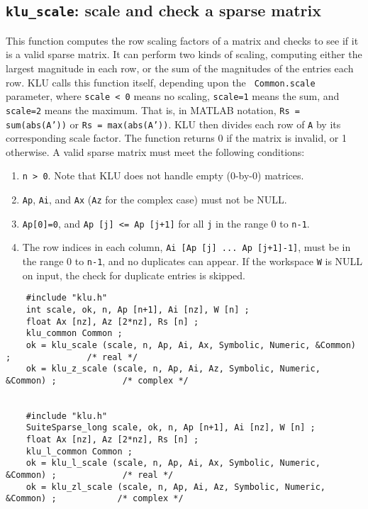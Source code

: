 \documentclass[11pt]{article}
\begin{document}
\subsection{{\tt klu\_scale}: scale and check a sparse matrix}

This function computes the row scaling factors of a matrix and checks to see if
it is a valid sparse matrix.  It can perform two kinds of scaling, computing
either the largest magnitude in each row, or the sum of the magnitudes of the
entries each row.  KLU calls this function itself, depending upon the {\tt
Common.scale} parameter, where {\tt scale < 0} means no scaling, {\tt scale=1}
means the sum, and {\tt scale=2} means the maximum.  That is, in MATLAB
notation, {\tt Rs = sum(abs(A'))} or {\tt Rs = max(abs(A'))}.  KLU then divides
each row of {\tt A} by its corresponding scale factor.  The function returns 0
if the matrix is invalid, or 1 otherwise.  A valid sparse matrix must meet the
following conditions:

\begin{enumerate}
\item {\tt n > 0}.  Note that KLU does not handle empty (0-by-0) matrices.
\item {\tt Ap}, {\tt Ai}, and {\tt Ax} ({\tt Az} for the complex case) must not be NULL.
\item {\tt Ap[0]=0}, and {\tt Ap [j] <= Ap [j+1]} for all {\tt j} in the range 0 to {\tt n-1}.
\item The row indices in each column, {\tt Ai [Ap [j] ... Ap [j+1]-1]}, must be in
the range 0 to {\tt n-1}, and no duplicates can appear.  If the workspace {\tt W} is
NULL on input, the check for duplicate entries is skipped.
\end{enumerate}

{\footnotesize
\begin{verbatim}
    #include "klu.h"
    int scale, ok, n, Ap [n+1], Ai [nz], W [n] ;
    float Ax [nz], Az [2*nz], Rs [n] ;
    klu_common Common ;
    ok = klu_scale (scale, n, Ap, Ai, Ax, Symbolic, Numeric, &Common) ;               /* real */
    ok = klu_z_scale (scale, n, Ap, Ai, Az, Symbolic, Numeric, &Common) ;             /* complex */


    #include "klu.h"
    SuiteSparse_long scale, ok, n, Ap [n+1], Ai [nz], W [n] ;
    float Ax [nz], Az [2*nz], Rs [n] ;
    klu_l_common Common ;
    ok = klu_l_scale (scale, n, Ap, Ai, Ax, Symbolic, Numeric, &Common) ;             /* real */
    ok = klu_zl_scale (scale, n, Ap, Ai, Az, Symbolic, Numeric, &Common) ;            /* complex */
\end{verbatim}
}
\end{document}
